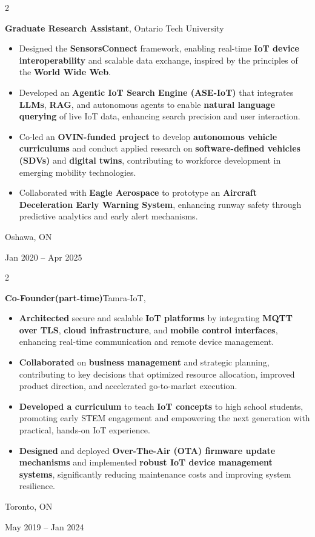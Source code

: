\documentclass[10pt, letterpaper]{article}
\newenvironment{highlights}{
    \begin{itemize}[
        topsep=0.10 cm,
        parsep=0.10 cm,
        partopsep=0pt,
        itemsep=0pt,
        leftmargin=0.4 cm + 10pt
    ]
}{
    \end{itemize}
} %
\newenvironment{twocolentry}[2][]{
    \onecolentry
    \def\secondColumn{#2}
    \setcolumnwidth{\fill, 4.5 cm}
    \begin{paracol}{2}
}{
    \switchcolumn \raggedleft \secondColumn
    \end{paracol}
    \endonecolentry
} %
\begin{document}
        \begin{twocolentry}{
    Oshawa, ON

    Jan 2020 – Apr 2025
    }
    \textbf{Graduate Research Assistant}, Ontario Tech University
    \begin{highlights}
        \item Designed the \textbf{SensorsConnect} framework, enabling real-time \textbf{IoT device interoperability} and scalable data exchange, inspired by the principles of the \textbf{World Wide Web}.
        \item Developed an \textbf{Agentic IoT Search Engine (ASE-IoT)} that integrates \textbf{LLMs}, \textbf{RAG}, and autonomous agents to enable \textbf{natural language querying} of live IoT data, enhancing search precision and user interaction.
        \item Co-led an \textbf{OVIN-funded project} to develop \textbf{autonomous vehicle curriculums} and conduct applied research on \textbf{software-defined vehicles (SDVs)} and \textbf{digital twins}, contributing to workforce development in emerging mobility technologies.
        \item Collaborated with \textbf{Eagle Aerospace} to prototype an \textbf{Aircraft Deceleration Early Warning System}, enhancing runway safety through predictive analytics and early alert mechanisms.
    \end{highlights}
\end{twocolentry}
        \vspace{0.1 cm}

\begin{twocolentry}{
            Toronto, ON

        May 2019 – Jan 2024
        }
            \textbf{ Co-Founder(part-time)}Tamra-IoT,
      \begin{highlights}
    \item \textbf{Architected} secure and scalable \textbf{IoT platforms} by integrating \textbf{MQTT over TLS}, \textbf{cloud infrastructure}, and \textbf{mobile control interfaces}, enhancing real-time communication and remote device management.

    \item \textbf{Collaborated} on \textbf{business management} and strategic planning, contributing to key decisions that optimized resource allocation, improved product direction, and accelerated go-to-market execution.

    \item \textbf{Developed a curriculum} to teach \textbf{IoT concepts} to high school students, promoting early STEM engagement and empowering the next generation with practical, hands-on IoT experience.

    \item \textbf{Designed} and deployed \textbf{Over-The-Air (OTA) firmware update mechanisms} and implemented \textbf{robust IoT device management systems}, significantly reducing maintenance costs and improving system resilience.
\end{highlights}

        \end{twocolentry}
\vspace{-.2cm}
\end{document}
